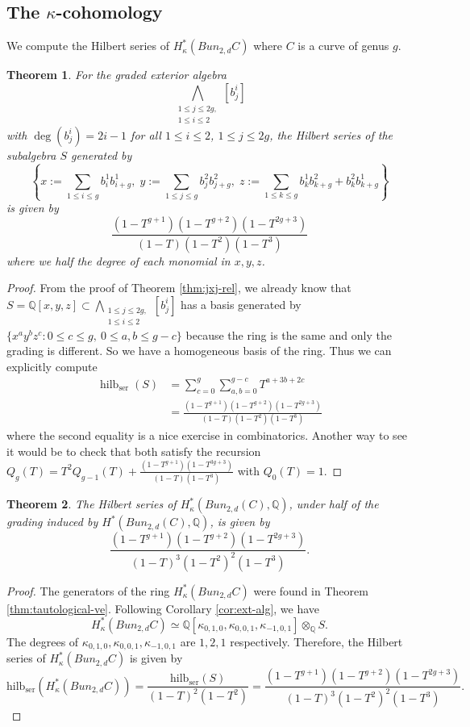 \documentclass[11pt]{amsart}
\newtheorem{theorem}{Theorem}[section]
\theoremstyle{definition}
\newcommand{\hilb}{\mathrm{hilb}_{\mathrm{ser}}}
\newcommand{\Q}{\mathbb{Q}}
\newcommand{\ka}{\kappa}
\begin{document}
\subsection{The $\ka$-cohomology}
We compute the Hilbert series of $H^*_\ka(Bun_{2,d}C)$ where $C$ is a curve of genus $g$.
\begin{theorem}\label{thm:ext-hilb}
    For the graded exterior algebra 
    $$\bigwedge_{\substack{1\leq j\leq 2g,\\1\leq i\leq 2}} [b^i_j]$$
with $\deg (b^i_j)=2i-1$ for all $1\leq i\leq 2$, $1\leq j\leq 2g$,
    the Hilbert series of the subalgebra $S$ generated by
    $$\left \{x:=\sum_{1\leq i\leq g}b^1_ib^1_{i+g},\;y:=\sum_{1\leq j\leq g}b^2_jb^2_{j+g},\;z:=\sum_{1\leq k\leq g}b^1_kb^2_{k+g}+b^2_kb^1_{k+g}\right \}$$
is given by
$$\dfrac{(1-T^{g+1})(1-T^{g+2})(1-T^{2g+3})}{(1-T)(1-T^2)(1-T^3)}$$
where we half the degree of each monomial in $x,y,z$.
\end{theorem}
\begin{proof}
From the proof of Theorem \ref{thm:jxj-rel}, we already know that $S=\mathbb Q[x,y,z] \subset\displaystyle{\bigwedge_{\substack{1\leq j\leq 2g,\\1\leq i\leq 2}} [b^i_j]}$ has a basis generated by $\{x^ay^b z^c : 0\leq c\leq g , \ 0\leq a,b \leq g-c  \}$ because the ring is the same and only the grading is different. So we have a homogeneous basis of the ring. Thus we can explicitly compute \begin{equation*}
    \begin{aligned}
        \operatorname{hilb}_{\operatorname{ser}} (S) & = \sum_{c=0}^g \sum_{a,b=0}^{g-c} T^{a+3b+2c} \\ & = \frac{(1-T^{g+1})(1-T^{g+2})(1-T^{2g+3})}{(1-T)(1-T^2)(1-T^3)}
    \end{aligned}
\end{equation*} where the second equality is a nice exercise in combinatorics. Another way to see it would be to check that both satisfy the recursion $Q_g(T) =T^2Q_{g-1}(T)+ \frac{(1-T^{g+1})(1-T^{3g+3})}{(1-T)(1-T^3)}$ with $Q_0(T)=1$.  
\end{proof}

\begin{theorem}\label{thm:hilb-ka}
   The Hilbert series of $H^*_\ka(Bun_{2,d}(C),\mathbb Q)$, under half of the grading induced by $H^*(Bun_{2,d}(C),\Q)$, is given by
   $$\dfrac{(1-T^{g+1})(1-T^{g+2})(1-T^{2g+3})}{(1-T)^3(1-T^2)^2(1-T^3)}.$$ 
\end{theorem}
\begin{proof}
The generators of the ring $H^*_\ka(Bun_{2,d}C)$ were found in Theorem \ref{thm:tautological-ve}.
Following Corollary \ref{cor:ext-alg}, we have
$$H^*_\ka(Bun_{2,d}C)\simeq \Q[\ka_{0,1,0},\ka_{0,0,1},\ka_{-1,0,1}]\otimes_\Q S.$$
The degrees of $\ka_{0,1,0},\ka_{0,0,1},\ka_{-1,0,1}$ are $1,2,1$ respectively. Therefore, the Hilbert series of $H^*_\ka(Bun_{2,d}C)$ is given by
$$\hilb (H^*_\ka(Bun_{2,d}C)) = \dfrac{\hilb (S)}{(1-T)^2(1-T^2)} = \dfrac{(1-T^{g+1})(1-T^{g+2})(1-T^{2g+3})}{(1-T)^3(1-T^2)^2(1-T^3)}.$$
\end{proof}
\end{document}
